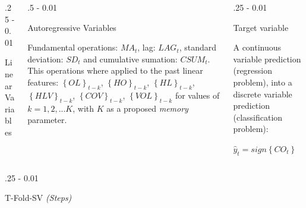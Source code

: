 \documentclass{postertheme}\usepackage[]{graphicx}\usepackage[]{color}
\begin{document}
\begin{frame}
\begin{columns}[onlytextwidth]
\begin{column}{.25 \textwidth - 0.01 \textwidth}
\begin{block}{Linear Variables}
    \end{block}
  \end{column}

  \begin{column}{.5 \textwidth - 0.01 \textwidth}
    \begin{block}{Autoregressive Variables}
        
      Fundamental operations: $MA_t$, lag: $LAG_t$, standard deviation: $SD_t$ and cumulative
      sumation: $CSUM_t$. This operations where applied to the past linear features: 
      $\left\{ OL \right\}_{t-k}$, $\left\{ HO \right\}_{t-k}$, $\left\{ HL \right\}_{t-k}$,
      $\left\{ HLV \right\}_{t-k}$, $\left\{ COV \right\}_{t-k}$, $\left\{ VOL \right\}_{t-k}$
      for values of $k = 1, 2, ... K$, with $K$ as a proposed \textit{memory} parameter.

    \end{block}
  \end{column}
  
  \begin{column}{.25 \textwidth - 0.01 \textwidth}
    \begin{block}{Target variable}
    
      A continuous variable prediction (regression problem), into
      a discrete variable prediction (classification problem):
      
      $\hat{y}_{t} = sign \left\{ CO_{t} \right\}$

    \end{block}
  \end{column}
  
\end{columns}


\begin{columns}[onlytextwidth]
  
  \begin{column}{.25 \textwidth - 0.01 \textwidth}
    \begin{block}{T-Fold-SV \footnotesize \textit{(Steps)}}
        
      \footnotesize
      

\end{block}
\end{column}
\end{columns}
\end{frame}
\end{document}
